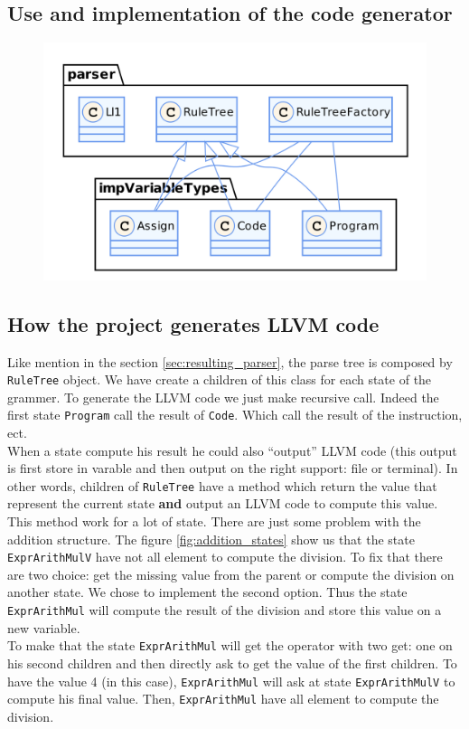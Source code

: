 \documentclass[a4paper,11pt]{article}
\begin{document}
  \subsection{Use and implementation of the code generator}
    \begin{figure}[h!]
      \centering
      \includegraphics[scale=0.175]{img/class_ruleTree.png}
    \end{figure}

  
  \subsection{How the project generates LLVM code}
    Like mention in the section \ref{sec:resulting_parser}, the parse tree is composed by \verb|RuleTree| object. We have create a children of this class for each state of the grammer. To generate the LLVM code we just make recursive call. Indeed the first state \verb|Program| call the result of \verb|Code|.  Which call the result of the instruction, ect.\\
    When a state compute his result he could also ``output'' LLVM code (this output is first store in varable and then output on the right support: file or terminal). In other words, children of \verb|RuleTree| have a method which return the value that represent the current state \textbf{and} output an LLVM code to compute this value.\\
    This method work for a lot of state. There are just some problem with the addition structure. The figure \ref{fig:addition_states} show us that the state \verb|ExprArithMulV| have not all element to compute the division. To fix that there are two choice: get the missing value from the parent or compute the division on another state. We chose to implement the second option.  Thus the state \verb|ExprArithMul| will compute the result of the division and store this value on a new variable.\\
    To make that the state \verb|ExprArithMul| will get the operator with two get: one on his second children and then directly ask to get the value of the first children. To have the value 4 (in this case), \verb|ExprArithMul| will ask at state \verb|ExprArithMulV| to compute his final value.  Then, \verb|ExprArithMul| have all element to compute the division.
    
\end{document}
